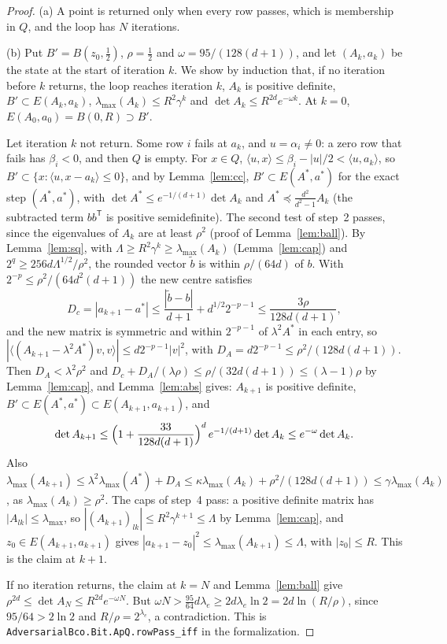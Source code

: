 \documentclass[11pt]{amsart}
\theoremstyle{definition}
\numberwithin{equation}{section}
\newcommand{\ip}[1]{\langle #1\rangle}
\begin{document}
\begin{proof}
(a) A point is returned only when every row passes, which is membership in $Q$, and the loop has $N$ iterations.

(b) Put $B'=B(z_0,\frac12)$, $\rho=\frac12$ and $\omega=95/(128(d+1))$, and let $(A_k,a_k)$ be the state at the start of iteration $k$. We show by induction that, if no iteration before $k$ returns, the loop reaches iteration $k$, $A_k$ is positive definite, $B'\subset E(A_k,a_k)$, $\lambda_{\max}(A_k)\le R^2\gamma^k$ and $\det A_k\le R^{2d}e^{-\omega k}$. At $k=0$, $E(A_0,a_0)=B(0,R)\supset B'$.

Let iteration $k$ not return. Some row $i$ fails at $a_k$, and $u=\alpha_i\ne0$: a zero row that fails has $\beta_i<0$, and then $Q$ is empty. For $x\in Q$, $\ip{u,x}\le\beta_i-|u|/2<\ip{u,a_k}$, so $B'\subset\{x:\ip{u,x-a_k}\le0\}$, and by Lemma~\ref{lem:cc}, $B'\subset E(A^*,a^*)$ for the exact step $(A^*,a^*)$, with $\det A^*\le e^{-1/(d+1)}\det A_k$ and $A^*\preceq\frac{d^2}{d^2-1}A_k$ (the subtracted term $bb^{\mathsf T}$ is positive semidefinite). The second test of step~2 passes, since the eigenvalues of $A_k$ are at least $\rho^2$ (proof of Lemma~\ref{lem:ball}). By Lemma~\ref{lem:sq}, with $\Lambda\ge R^2\gamma^k\ge\lambda_{\max}(A_k)$ (Lemma~\ref{lem:cap}) and $2^q\ge256d\Lambda^{1/2}/\rho^2$, the rounded vector $\tilde b$ is within $\rho/(64d)$ of $b$. With $2^{-p}\le\rho^2/(64d^2(d+1))$ the new centre satisfies
\[
D_c=|a_{k+1}-a^*|\le\frac{|\tilde b-b|}{d+1}+d^{1/2}2^{-p-1}\le\frac{3\rho}{128d(d+1)},
\]
and the new matrix is symmetric and within $2^{-p-1}$ of $\lambda^2A^*$ in each entry, so $|\ip{(A_{k+1}-\lambda^2A^*)v,v}|\le d2^{-p-1}|v|^2$, with $D_A=d2^{-p-1}\le\rho^2/(128d(d+1))$. Then $D_A<\lambda^2\rho^2$ and $D_c+D_A/(\lambda\rho)\le\rho/(32d(d+1))\le(\lambda-1)\rho$ by Lemma~\ref{lem:cap}, and Lemma~\ref{lem:abs} gives: $A_{k+1}$ is positive definite, $B'\subset E(A^*,a^*)\subset E(A_{k+1},a_{k+1})$, and
\[
\det A_{k+1}\le\Bigl(1+\frac{33}{128d(d+1)}\Bigr)^{d}\,e^{-1/(d+1)}\det A_k\le e^{-\omega}\det A_k .
\]
Also $\lambda_{\max}(A_{k+1})\le\lambda^2\lambda_{\max}(A^*)+D_A\le\kappa\lambda_{\max}(A_k)+\rho^2/(128d(d+1))\le\gamma\lambda_{\max}(A_k)$, as $\lambda_{\max}(A_k)\ge\rho^2$. The caps of step~4 pass: a positive definite matrix has $|A_{lk}|\le\lambda_{\max}$, so $|(A_{k+1})_{lk}|\le R^2\gamma^{k+1}\le\Lambda$ by Lemma~\ref{lem:cap}, and $z_0\in E(A_{k+1},a_{k+1})$ gives $|a_{k+1}-z_0|^2\le\lambda_{\max}(A_{k+1})\le\Lambda$, with $|z_0|\le R$. This is the claim at $k+1$.

If no iteration returns, the claim at $k=N$ and Lemma~\ref{lem:ball} give $\rho^{2d}\le\det A_N\le R^{2d}e^{-\omega N}$. But $\omega N>\frac{95}{64}d\lambda_e\ge2d\lambda_e\ln2=2d\ln(R/\rho)$, since $95/64>2\ln2$ and $R/\rho=2^{\lambda_e}$, a contradiction.
This is \texttt{AdversarialBco.Bit.ApQ.rowPass\_iff} in the formalization.
\end{proof}
\end{document}
